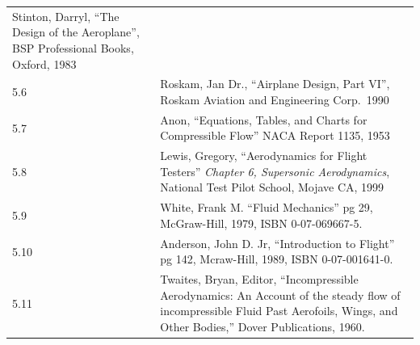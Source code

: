 \documentclass[
]{book}
\begin{document}
\begin{longtable}[]{@{}ll@{}}
\begin{minipage}[t]{0.88\columnwidth}
Stinton, Darryl, ``The Design of the Aeroplane'', BSP Professional Books, Oxford, 1983\strut
\end{minipage}\tabularnewline
\begin{minipage}[t]{0.06\columnwidth}\raggedright
5.6\strut
\end{minipage} & \begin{minipage}[t]{0.88\columnwidth}\raggedright
Roskam, Jan Dr., ``Airplane Design, Part VI'', Roskam Aviation and Engineering Corp.~1990\strut
\end{minipage}\tabularnewline
\begin{minipage}[t]{0.06\columnwidth}\raggedright
5.7\strut
\end{minipage} & \begin{minipage}[t]{0.88\columnwidth}\raggedright
Anon, ``Equations, Tables, and Charts for Compressible Flow'' NACA Report 1135, 1953\strut
\end{minipage}\tabularnewline
\begin{minipage}[t]{0.06\columnwidth}\raggedright
5.8\strut
\end{minipage} & \begin{minipage}[t]{0.88\columnwidth}\raggedright
Lewis, Gregory, ``Aerodynamics for Flight Testers'' \emph{Chapter 6, Supersonic Aerodynamics}, National Test Pilot School, Mojave CA, 1999\strut
\end{minipage}\tabularnewline
\begin{minipage}[t]{0.06\columnwidth}\raggedright
5.9\strut
\end{minipage} & \begin{minipage}[t]{0.88\columnwidth}\raggedright
White, Frank M. ``Fluid Mechanics'' pg 29, McGraw-Hill, 1979, ISBN 0-07-069667-5.\strut
\end{minipage}\tabularnewline
\begin{minipage}[t]{0.06\columnwidth}\raggedright
5.10\strut
\end{minipage} & \begin{minipage}[t]{0.88\columnwidth}\raggedright
Anderson, John D. Jr, ``Introduction to Flight'' pg 142, Mcraw-Hill, 1989, ISBN 0-07-001641-0.\strut
\end{minipage}\tabularnewline
\begin{minipage}[t]{0.06\columnwidth}\raggedright
5.11\strut
\end{minipage} & \begin{minipage}[t]{0.88\columnwidth}\raggedright
Twaites, Bryan, Editor, ``Incompressible Aerodynamics: An Account of the steady flow of incompressible Fluid Past Aerofoils, Wings, and Other Bodies,'' Dover Publications, 1960.\strut
\end{minipage}\tabularnewline
\bottomrule
\end{longtable}
\end{document}
